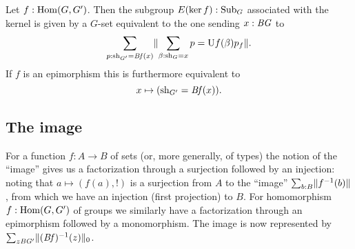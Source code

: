 \begin{xca}
  Let $f:\Hom(G,G')$.  Then the subgroup $E(\ker f):\typesubgroup_G$ associated with the kernel is given by a $G$-set equivalent to the one sending $x:\mathit{B}\mathit{G}$ to
  $$\sum_{p:\mathrm{sh}_{G'}=\mathit{B}\mathit{f}(x)}\lVert\sum_{\beta:\mathrm{sh}_G=x}p=\mathrm{U} f(\beta)p_f\rVert.$$
  If $f$ is an epimorphism this is furthermore equivalent to
  $$x\mapsto(\mathrm{sh}_{G'}=\mathit{B}\mathit{f}(x)).$$
\end{xca}

\subsection{The image}
\label{sec:image}

For a function $f:A\to B$ of sets (or, more generally, of types) the notion of the ``image'' gives us a factorization through a surjection followed by an injection: noting that $a\mapsto (f(a),!)$ is a surjection from $A$ to the ``image'' $\sum_{b:B}\lVert f^{-1}(b)\rVert$, from which we have an injection (first projection) to $B$.
For homomorphism $f:\Hom(G,G')$ of groups we similarly have a factorization through an epimorphism followed by a monomorphism.  The image is now represented by %
$\sum_{z\mathit{B}\mathit{G}'}\lVert(\mathit{B}\mathit{f})^{-1}(z)\rVert_0$.

